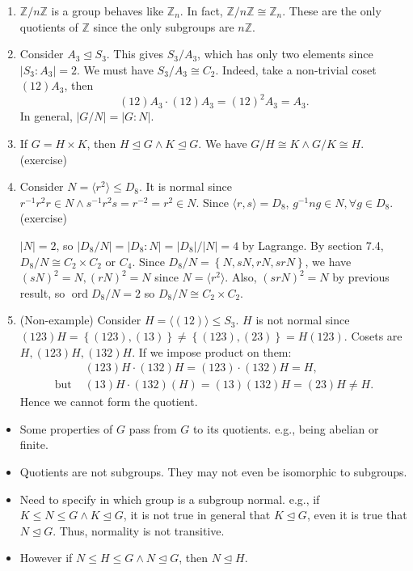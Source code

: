 \documentclass[10pt]{article}
\def\le{\leqslant}
\def\ltrigeq{\trianglelefteq}
\newcommand{\bluecomment}[1]{{\color{blue}#1}}
\DeclareMathOperator{\ord}{ord}
\begin{document}
    \begin{example}
        \begin{enumerate}
            \item $ \mathbb{Z}/n\mathbb{Z} $ is a group behaves like $ \mathbb{Z}_{n} $. In fact, $ \mathbb{Z}/n\mathbb{Z} \cong \mathbb{Z}_{n} $. These are the only quotients of $ \mathbb{Z} $ since the only subgroups are $ n \mathbb{Z} $.
            \item Consider $ A_3 \ltrigeq S_3 $. This gives $ S_3/A_3$, which has only two elements since $ |S_3:A_3|=2 $. We must have $ S_3/A_3 \cong C_2 $. Indeed, take a non-trivial coset $ (12) A_3$, then
            \[
                (12)A_3\cdot (12)A_3=(12)^2A_3=A_3
            .\]
            \bluecomment{In general, $ |G/N| =|G:N|$.}
            \item If $ G=H\times K $, then $ H \ltrigeq G \land K\ltrigeq G $. We have $ G/H \cong K \land G/K \cong H $.(exercise)
            \item Consider $ N=\langle r^2 \rangle \le D_8 $. It is normal since $ r^{-1}r^2r\in N \land s^{-1}r^2s=r^{-2}=r^2\in N $. Since $ \langle r,s \rangle =D_8 $, $ g^{-1}ng\in N, \forall g\in D_8 $.(exercise)

            $ |N|=2 $, so $ |D_8/N|=|D_8:N|=|D_8|/|N|=4 $ by Lagrange. By section 7.4, $ D_8/N\cong C_2\times C_2 \text{ or } C_4 $. Since $ D_8/N=\left\{ N,sN,rN,srN\right\} $, we have $ (sN)^2=N, (rN)^2=N $ since $ N=\langle r^2 \rangle $. Also, $ (srN)^2=N $ by previous result, so $ \ord D_8/N=2 $ so $ D_8/N\cong C_2 \times C_2 $.
            \item (Non-example) Consider $ H=\langle (12) \rangle \le S_3 $. $H$ is not normal since $ (123)H=\left\{ (123),(13)\right\}\neq \left\{ (123),(23)\right\}=H(123) $. Cosets are $ H, (123)H, (132)H $. If we impose product on them:
            \[
                \begin{aligned}
                    &(123)H\cdot (132)H=(123)\cdot (132)H=H,\\ 
                    \text{but } &(13)H\cdot (132)(H)=(13)(132)H=(23)H\neq H.
                \end{aligned}
            \]
            Hence we cannot form the quotient.
        \end{enumerate}
    \end{example}
    \begin{remark}
        \begin{itemize}
            \item Some properties of $G$ pass from $G$ to its quotients. e.g., being abelian or finite.
            \item Quotients are not subgroups. They may not even be isomorphic to subgroups.
            \item Need to specify in which group is a subgroup normal. e.g., if $ K\le N\le G \land K \ltrigeq G $, it is not true in general that $ K \ltrigeq G$, even it is true that $ N\ltrigeq G $. Thus, normality is not transitive.
            \item However if $ N\le H\le G  \land N \ltrigeq G$, then $ N\ltrigeq H $.
        \end{itemize}
    \end{remark}
\end{document}
